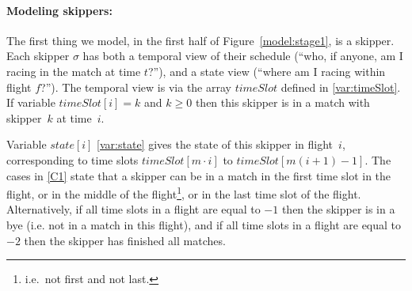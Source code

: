 \documentclass{llncs}
\newcommand{\timeSlot}{\mathit{timeSlot}}
\newcommand{\state}{\mathit{state}}
\begin{document}
\paragraph{Modeling skippers:} The first thing we model, in the first half of
Figure~\ref{model:stage1}, is a skipper. Each skipper $\sigma$ has both a temporal view of their
schedule (``who, if anyone, am I racing in the match at time $t$?''), and a state view (``where am
I racing within flight $f$?'').  The temporal view is via the array $\timeSlot$ defined in
\eqref{var:timeSlot}. If variable $\timeSlot[{i}] = k$ and $k \geq 0$ then this skipper is in a
match with skipper~$k$ at time~$i$.

Variable $\state[{i}]$ \eqref{var:state} gives the state of this skipper in flight~$i$,
corresponding to time slots $\timeSlot[{m \cdot i}]$ to $\timeSlot[{m(i+1)-1}]$.
The cases in \eqref{C1} state that a skipper can be in a match in the first time slot in the flight,
or in the middle of the flight\footnote{i.e.\ not first and not last.}, or in the last time slot of
the flight. Alternatively, if all time slots in a flight are equal to $-1$ then the skipper is in a
bye (i.e. not in a match in this flight), and if all time slots in a flight are equal to $-2$ then
the skipper has finished all matches.
\end{document}
